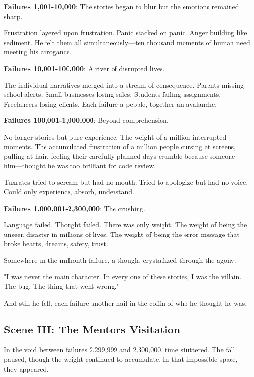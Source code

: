 \textbf{Failures 1,001-10,000}: The stories began to blur but the emotions remained sharp.

Frustration layered upon frustration. Panic stacked on panic. Anger building like sediment. He felt them all simultaneously---ten thousand moments of human need meeting his arrogance.

\textbf{Failures 10,001-100,000}: A river of disrupted lives.

The individual narratives merged into a stream of consequence. Parents missing school alerts. Small businesses losing sales. Students failing assignments. Freelancers losing clients. Each failure a pebble, together an avalanche.

\textbf{Failures 100,001-1,000,000}: Beyond comprehension.

No longer stories but pure experience. The weight of a million interrupted moments. The accumulated frustration of a million people cursing at screens, pulling at hair, feeling their carefully planned days crumble because someone---him---thought he was too brilliant for code review.

Tuxrates tried to scream but had no mouth. Tried to apologize but had no voice. Could only experience, absorb, understand.

\textbf{Failures 1,000,001-2,300,000}: The crushing.

Language failed. Thought failed. There was only weight. The weight of being the unseen disaster in millions of lives. The weight of being the error message that broke hearts, dreams, safety, trust.

Somewhere in the millionth failure, a thought crystallized through the agony:

"I was never the main character. In every one of these stories, I was the villain. The bug. The thing that went wrong."

And still he fell, each failure another nail in the coffin of who he thought he was.

\bookdivider

\subsection{Scene III: The Mentors\textquotesingle{} Visitation}\label{scene-iii-the-mentors-visitation}

In the void between failures 2,299,999 and 2,300,000, time stuttered. The fall paused, though the weight continued to accumulate. In that impossible space, they appeared.


